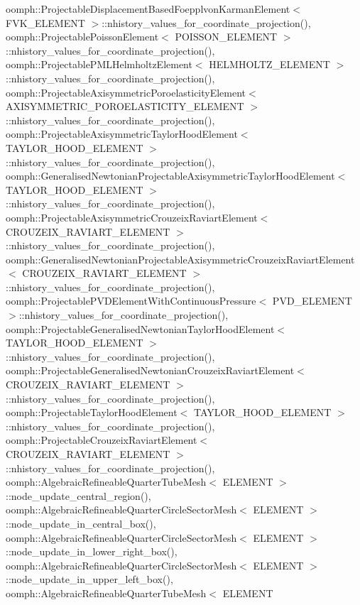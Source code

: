 oomph\+::\+Projectable\+Displacement\+Based\+Foepplvon\+Karman\+Element$<$ F\+V\+K\+\_\+\+E\+L\+E\+M\+E\+N\+T $>$\+::nhistory\+\_\+values\+\_\+for\+\_\+coordinate\+\_\+projection(), oomph\+::\+Projectable\+Poisson\+Element$<$ P\+O\+I\+S\+S\+O\+N\+\_\+\+E\+L\+E\+M\+E\+N\+T $>$\+::nhistory\+\_\+values\+\_\+for\+\_\+coordinate\+\_\+projection(), oomph\+::\+Projectable\+P\+M\+L\+Helmholtz\+Element$<$ H\+E\+L\+M\+H\+O\+L\+T\+Z\+\_\+\+E\+L\+E\+M\+E\+N\+T $>$\+::nhistory\+\_\+values\+\_\+for\+\_\+coordinate\+\_\+projection(), oomph\+::\+Projectable\+Axisymmetric\+Poroelasticity\+Element$<$ A\+X\+I\+S\+Y\+M\+M\+E\+T\+R\+I\+C\+\_\+\+P\+O\+R\+O\+E\+L\+A\+S\+T\+I\+C\+I\+T\+Y\+\_\+\+E\+L\+E\+M\+E\+N\+T $>$\+::nhistory\+\_\+values\+\_\+for\+\_\+coordinate\+\_\+projection(), oomph\+::\+Projectable\+Axisymmetric\+Taylor\+Hood\+Element$<$ T\+A\+Y\+L\+O\+R\+\_\+\+H\+O\+O\+D\+\_\+\+E\+L\+E\+M\+E\+N\+T $>$\+::nhistory\+\_\+values\+\_\+for\+\_\+coordinate\+\_\+projection(), oomph\+::\+Generalised\+Newtonian\+Projectable\+Axisymmetric\+Taylor\+Hood\+Element$<$ T\+A\+Y\+L\+O\+R\+\_\+\+H\+O\+O\+D\+\_\+\+E\+L\+E\+M\+E\+N\+T $>$\+::nhistory\+\_\+values\+\_\+for\+\_\+coordinate\+\_\+projection(), oomph\+::\+Projectable\+Axisymmetric\+Crouzeix\+Raviart\+Element$<$ C\+R\+O\+U\+Z\+E\+I\+X\+\_\+\+R\+A\+V\+I\+A\+R\+T\+\_\+\+E\+L\+E\+M\+E\+N\+T $>$\+::nhistory\+\_\+values\+\_\+for\+\_\+coordinate\+\_\+projection(), oomph\+::\+Generalised\+Newtonian\+Projectable\+Axisymmetric\+Crouzeix\+Raviart\+Element$<$ C\+R\+O\+U\+Z\+E\+I\+X\+\_\+\+R\+A\+V\+I\+A\+R\+T\+\_\+\+E\+L\+E\+M\+E\+N\+T $>$\+::nhistory\+\_\+values\+\_\+for\+\_\+coordinate\+\_\+projection(), oomph\+::\+Projectable\+P\+V\+D\+Element\+With\+Continuous\+Pressure$<$ P\+V\+D\+\_\+\+E\+L\+E\+M\+E\+N\+T $>$\+::nhistory\+\_\+values\+\_\+for\+\_\+coordinate\+\_\+projection(), oomph\+::\+Projectable\+Generalised\+Newtonian\+Taylor\+Hood\+Element$<$ T\+A\+Y\+L\+O\+R\+\_\+\+H\+O\+O\+D\+\_\+\+E\+L\+E\+M\+E\+N\+T $>$\+::nhistory\+\_\+values\+\_\+for\+\_\+coordinate\+\_\+projection(), oomph\+::\+Projectable\+Generalised\+Newtonian\+Crouzeix\+Raviart\+Element$<$ C\+R\+O\+U\+Z\+E\+I\+X\+\_\+\+R\+A\+V\+I\+A\+R\+T\+\_\+\+E\+L\+E\+M\+E\+N\+T $>$\+::nhistory\+\_\+values\+\_\+for\+\_\+coordinate\+\_\+projection(), oomph\+::\+Projectable\+Taylor\+Hood\+Element$<$ T\+A\+Y\+L\+O\+R\+\_\+\+H\+O\+O\+D\+\_\+\+E\+L\+E\+M\+E\+N\+T $>$\+::nhistory\+\_\+values\+\_\+for\+\_\+coordinate\+\_\+projection(), oomph\+::\+Projectable\+Crouzeix\+Raviart\+Element$<$ C\+R\+O\+U\+Z\+E\+I\+X\+\_\+\+R\+A\+V\+I\+A\+R\+T\+\_\+\+E\+L\+E\+M\+E\+N\+T $>$\+::nhistory\+\_\+values\+\_\+for\+\_\+coordinate\+\_\+projection(), oomph\+::\+Algebraic\+Refineable\+Quarter\+Tube\+Mesh$<$ E\+L\+E\+M\+E\+N\+T $>$\+::node\+\_\+update\+\_\+central\+\_\+region(), oomph\+::\+Algebraic\+Refineable\+Quarter\+Circle\+Sector\+Mesh$<$ E\+L\+E\+M\+E\+N\+T $>$\+::node\+\_\+update\+\_\+in\+\_\+central\+\_\+box(), oomph\+::\+Algebraic\+Refineable\+Quarter\+Circle\+Sector\+Mesh$<$ E\+L\+E\+M\+E\+N\+T $>$\+::node\+\_\+update\+\_\+in\+\_\+lower\+\_\+right\+\_\+box(), oomph\+::\+Algebraic\+Refineable\+Quarter\+Circle\+Sector\+Mesh$<$ E\+L\+E\+M\+E\+N\+T $>$\+::node\+\_\+update\+\_\+in\+\_\+upper\+\_\+left\+\_\+box(), oomph\+::\+Algebraic\+Refineable\+Quarter\+Tube\+Mesh$<$ E\+L\+E\+M\+E\+N\+T 